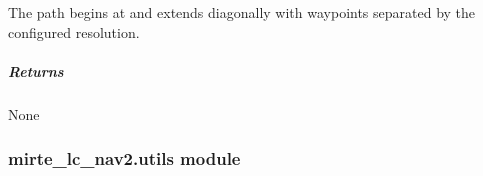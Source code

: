 \documentclass[letterpaper,10pt,english]{sphinxmanual}
\begin{document}
\begin{fulllineitems}
\begin{fulllineitems}
\sphinxAtStartPar
The path begins at  and extends diagonally
with waypoints separated by the configured resolution.


\subparagraph{Returns}
\label{\detokenize{mirte_lc_nav2.navigators:id29}}
\sphinxAtStartPar
None

\end{fulllineitems}


\begin{fulllineitems}
\label{\detokenize{mirte_lc_nav2.navigators:mirte_lc_nav2.navigators.StraightLinePath.name}}
\pysigstartsignatures
\pysigline
{}
\pysigstopsignatures
\end{fulllineitems}


\end{fulllineitems}


\sphinxstepscope


\subsubsection{mirte\_lc\_nav2.utils module}
\label{\detokenize{mirte_lc_nav2.utils:module-mirte_lc_nav2.utils}}\label{\detokenize{mirte_lc_nav2.utils:mirte-lc-nav2-utils-module}}\label{\detokenize{mirte_lc_nav2.utils::doc}}
\end{document}
